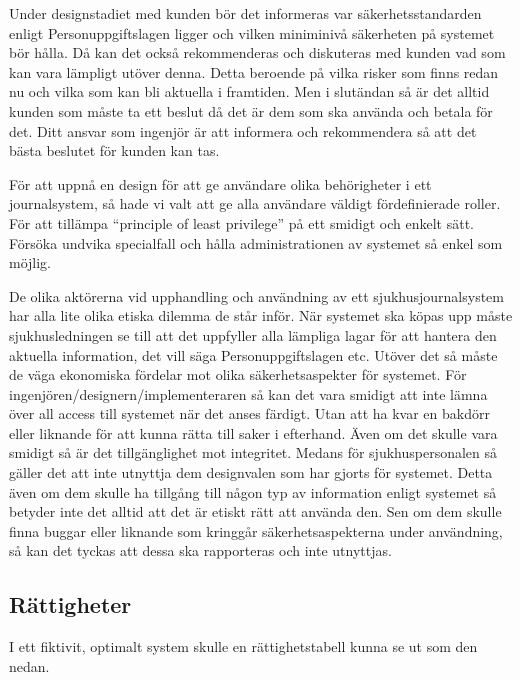 \documentclass[a4paper]{article}
\begin{document}
Under designstadiet med kunden bör det informeras var säkerhetsstandarden enligt Personuppgiftslagen ligger och vilken miniminivå säkerheten på systemet bör hålla. Då kan det också rekommenderas och diskuteras med kunden vad som kan vara lämpligt utöver denna. Detta beroende på vilka risker som finns redan nu och vilka som kan bli aktuella i framtiden. Men i slutändan så är det alltid kunden som måste ta ett beslut då det är dem som ska använda och betala för det. Ditt ansvar som ingenjör är att informera och rekommendera så att det bästa beslutet för kunden kan tas.

För att uppnå en design för att ge användare olika behörigheter i ett journalsystem, så hade vi valt att ge alla användare väldigt fördefinierade roller. För att tillämpa “principle of least privilege” på ett smidigt och enkelt sätt. Försöka undvika specialfall och hålla administrationen av systemet så enkel som möjlig.

De olika aktörerna vid upphandling och användning av ett sjukhusjournalsystem har alla lite olika etiska dilemma de står inför. När systemet ska köpas upp måste sjukhusledningen se till att det uppfyller alla lämpliga lagar för att hantera den aktuella information, det vill säga Personuppgiftslagen etc. Utöver det så måste de väga ekonomiska fördelar mot olika säkerhetsaspekter för systemet. För ingenjören/designern/implementeraren så kan det vara smidigt att inte lämna över all access till systemet när det anses färdigt. Utan att ha kvar en bakdörr eller liknande för att kunna rätta till saker i efterhand. Även om det skulle vara smidigt så är det tillgänglighet mot integritet. Medans för sjukhuspersonalen så gäller det att inte utnyttja dem designvalen som har gjorts för systemet.  Detta även om dem skulle ha tillgång till någon typ av information enligt systemet så betyder inte det alltid att det är etiskt rätt att använda den. Sen om dem skulle finna buggar eller liknande som kringgår säkerhetsaspekterna under användning, så kan det tyckas att dessa ska rapporteras och inte utnyttjas.

\subsection{Rättigheter}
I ett fiktivit, optimalt system skulle en rättighetstabell kunna se ut som den nedan.
\end{document}
